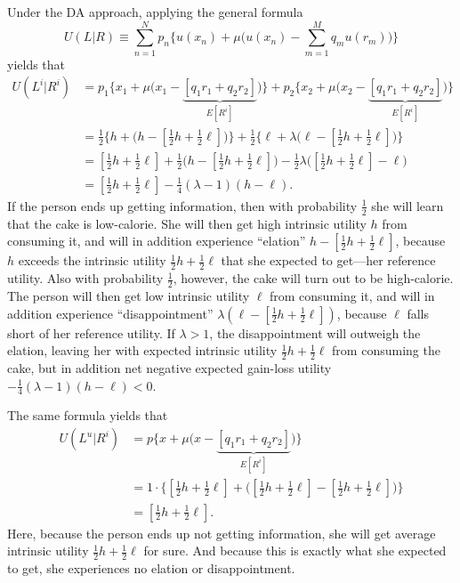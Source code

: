 \documentclass[11pt,reqno]{amsart}
\newcommand{\half}{\tfrac{1}{2}}
\newcommand{\qrtr}{\tfrac{1}{4}}
\begin{document}
Under the DA approach, applying the general formula
\begin{equation*}
  U(L|R) \equiv \sum_{n=1}^N p_n\biggl\{u(x_n) + \mu\biggl(u(x_n) - \sum_{m=1}^M q_m
u(r_m)\biggr)\biggr\}
\end{equation*}
yields that
\begin{align*}
  U(L^i|R^i) 
&= p_1\bigl\{x_1 + \mu\bigl(x_1 - \underbrace{[q_1r_1 + q_2r_2]}_{E[R^i]}\bigr)\bigr\}
 + p_2\bigl\{x_2 + \mu\bigl(x_2 - \underbrace{[q_1r_1 + q_2r_2]}_{E[R^i]}\bigr)\bigr\}
\\
&= \half\bigl\{h + \bigl(h - [\half h + \half\ell]\bigr)\bigr\}
 + \half\bigl\{\ell + \lambda\bigl(\ell - [\half h + \half \ell]\bigr)\bigr\}
\\
&= [\half h + \half \ell] + \half\bigl(h - [\half h + \half\ell]\bigr)
   - \half\lambda\bigl([\half h + \half \ell] - \ell\bigr)
\\
&= [\half h + \half \ell] - \qrtr(\lambda - 1)(h - \ell).
\end{align*}
If the person ends up getting information, then with probability $\half$ she
will learn that the cake is low-calorie. She will then get high intrinsic
utility $h$ from consuming it, and will in addition experience ``elation'' $h
- [\half h + \half\ell]$, because $h$ exceeds the intrinsic utility $\half h +
\half \ell$ that she expected to get---her reference utility. Also with
probability $\half$, however, the cake will turn out to be high-calorie. The
person will then get low intrinsic utility $\ell$ from consuming it, and will
in addition experience ``disappointment'' $\lambda(\ell - [\half h +
\half\ell])$, because $\ell$ falls short of her reference utility. If $\lambda
> 1$, the disappointment will outweigh the elation, leaving her with expected
intrinsic utility $\half h + \half \ell$ from consuming the cake, but in
addition net negative expected gain-loss utility $- \qrtr(\lambda - 1)(h -
\ell) < 0$. 

The same formula yields that
\begin{align*}
  U(L^u|R^i) 
&= p\bigl\{x + \mu\bigl(x - \underbrace{[q_1r_1 + q_2r_2]}_{E[R^i]}\bigr)\bigr\}
\\
&= 1\cdot\bigl\{[\half h + \half \ell] + \bigl([\half h + \half \ell] - [\half h + \half \ell]\bigr)\bigr\}\\
&= [\half h + \half \ell].
\end{align*}
Here, because the person ends up not getting information, she will get average
intrinsic utility $\half h + \half \ell$ for sure. And because this is exactly
what she expected to get, she experiences no elation or disappointment.
\end{document}
